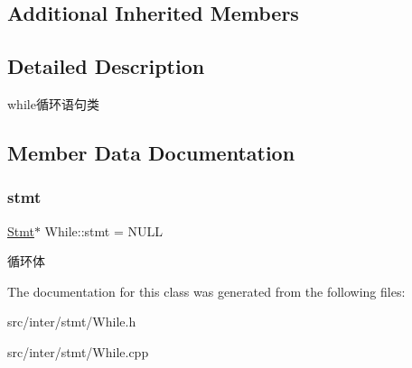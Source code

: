 \subsection*{Additional Inherited Members}


\subsection{Detailed Description}
while循环语句类 

\subsection{Member Data Documentation}
\mbox{\label{class_while_a97dfbf50f27b969c5b765ecfb1ef4ac2}} 
\subsubsection{\texorpdfstring{stmt}{stmt}}
{\footnotesize\ttfamily \hyperlink{class_stmt}{Stmt}$\ast$ While\+::stmt = N\+U\+LL}

循环体 

The documentation for this class was generated from the following files\+:\begin{DoxyCompactItemize}
\item 
src/inter/stmt/While.\+h\item 
src/inter/stmt/While.\+cpp\end{DoxyCompactItemize}
